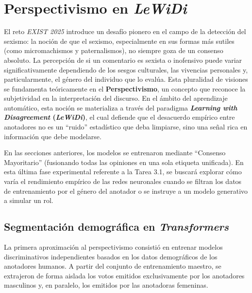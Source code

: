 \section{Perspectivismo en \textit{LeWiDi}}
\label{sec:PerspectivismoEnLewidi}
El reto \textit{EXIST 2025} introduce un desafío pionero en el campo de la detección del sexismo: la noción de que el sexismo, especialmente en sus formas más sutiles (como micromachismos y paternalismos), no siempre goza de un consenso absoluto. La percepción de si un comentario es sexista o inofensivo puede variar significativamente dependiendo de los sesgos culturales, las vivencias personales y, particularmente, el género del individuo que lo evalúa. Esta pluralidad de visiones se fundamenta teóricamente en el \textbf{Perspectivismo}, un concepto que reconoce la subjetividad en la interpretación del discurso. En el ámbito del aprendizaje automático, esta noción se materializa a través del paradigma \textbf{\textit{Learning with Disagreement} (\textit{LeWiDi})}, el cual defiende que el desacuerdo empírico entre anotadores no es un ``ruido'' estadístico que deba limpiarse, sino una señal rica en información que debe modelarse.

En las secciones anteriores, los modelos se entrenaron mediante ``Consenso Mayoritario'' (fusionando todas las opiniones en una sola etiqueta unificada). En esta última fase experimental referente a la Tarea 3.1, se buscará explorar cómo varía el rendimiento empírico de las redes neuronales cuando se filtran los datos de entrenamiento por el género del anotador o se instruye a un modelo generativo a simular un rol. 

\subsection{Segmentación demográfica en \textit{Transformers}}
\label{subsec:SegmentacionDemograficaEnTransformers}
La primera aproximación al perspectivismo consistió en entrenar modelos discriminativos independientes basados en los datos demográficos de los anotadores humanos. A partir del conjunto de entrenamiento maestro, se extrajeron de forma aislada los votos emitidos exclusivamente por los anotadores masculinos y, en paralelo, los emitidos por las anotadoras femeninas. 

